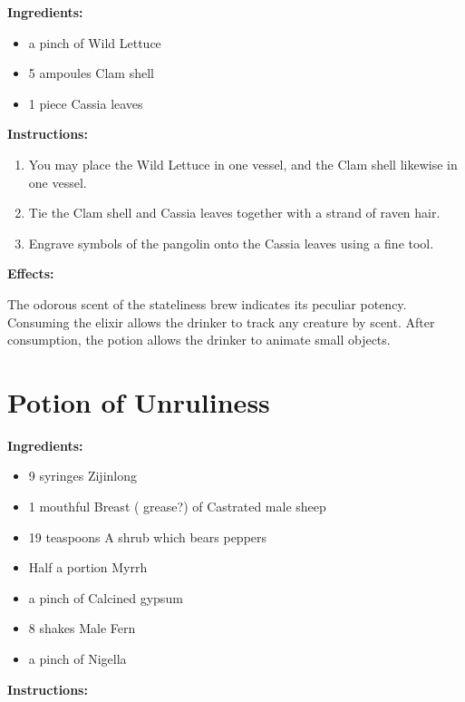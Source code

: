 \documentclass{article}
\begin{document}
\textbf{Ingredients:}

\begin{itemize}
  \item a pinch of Wild Lettuce
  \item 5 ampoules Clam shell
  \item 1 piece Cassia leaves
\end{itemize}

\textbf{Instructions:}

\begin{enumerate}
  \item You may place the Wild Lettuce in one vessel, and the Clam shell likewise in one vessel.
  \item Tie the Clam shell and Cassia leaves together with a strand of raven hair.
  \item Engrave symbols of the pangolin onto the Cassia leaves using a fine tool.
\end{enumerate}

\textbf{Effects:}

The odorous scent of the stateliness brew indicates its peculiar potency. Consuming the elixir allows the drinker to track any creature by scent. After consumption, the potion allows the drinker to animate small objects.

\newpage
\section*{Potion of Unruliness}

\textbf{Ingredients:}

\begin{itemize}
  \item 9 syringes Zijinlong
  \item 1 mouthful Breast ( grease?) of Castrated male sheep
  \item 19 teaspoons A shrub which bears peppers
  \item Half a portion Myrrh
  \item a pinch of Calcined gypsum
  \item 8 shakes Male Fern
  \item a pinch of Nigella
\end{itemize}

\textbf{Instructions:}
\end{document}
